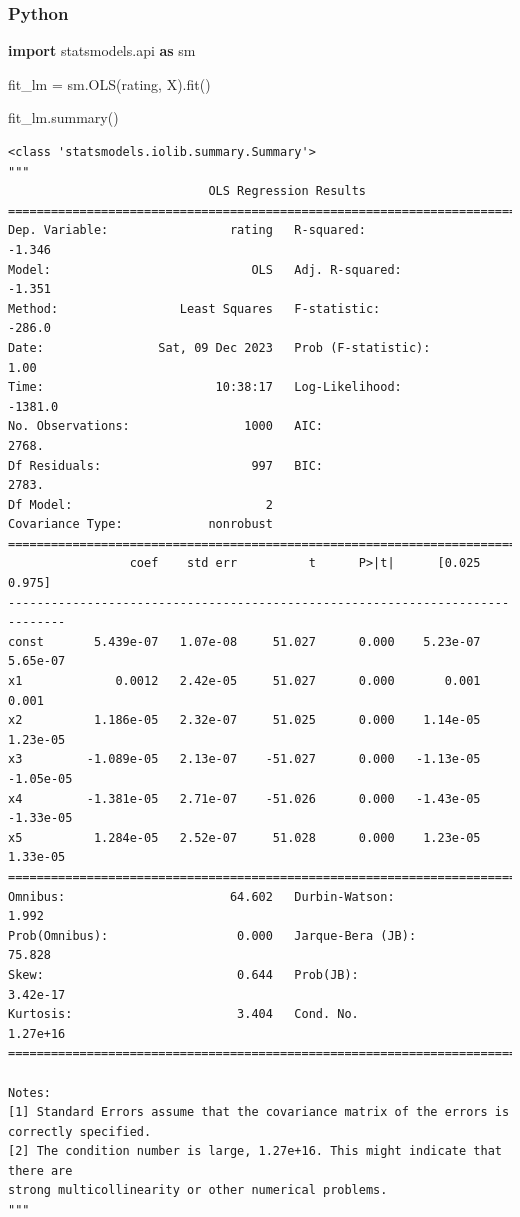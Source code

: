 \documentclass[
  letterpaper,
]{krantz}
\newenvironment{Shaded}{}{}
\newcommand{\ImportTok}[1]{\textcolor[rgb]{0.00,0.50,0.00}{\textbf{#1}}}
\newcommand{\NormalTok}[1]{#1}
\newcommand{\OperatorTok}[1]{\textcolor[rgb]{0.40,0.40,0.40}{#1}}
\begin{document}
\subsubsection{Python}

\begin{Shaded}
\begin{Highlighting}[]
\ImportTok{import}\NormalTok{ statsmodels.api }\ImportTok{as}\NormalTok{ sm}

\NormalTok{fit\_lm }\OperatorTok{=}\NormalTok{ sm.OLS(rating, X).fit()}

\NormalTok{fit\_lm.summary()}
\end{Highlighting}
\end{Shaded}

\begin{verbatim}
<class 'statsmodels.iolib.summary.Summary'>
"""
                            OLS Regression Results                            
==============================================================================
Dep. Variable:                 rating   R-squared:                      -1.346
Model:                            OLS   Adj. R-squared:                 -1.351
Method:                 Least Squares   F-statistic:                    -286.0
Date:                Sat, 09 Dec 2023   Prob (F-statistic):               1.00
Time:                        10:38:17   Log-Likelihood:                -1381.0
No. Observations:                1000   AIC:                             2768.
Df Residuals:                     997   BIC:                             2783.
Df Model:                           2                                         
Covariance Type:            nonrobust                                         
==============================================================================
                 coef    std err          t      P>|t|      [0.025      0.975]
------------------------------------------------------------------------------
const       5.439e-07   1.07e-08     51.027      0.000    5.23e-07    5.65e-07
x1             0.0012   2.42e-05     51.027      0.000       0.001       0.001
x2          1.186e-05   2.32e-07     51.025      0.000    1.14e-05    1.23e-05
x3         -1.089e-05   2.13e-07    -51.027      0.000   -1.13e-05   -1.05e-05
x4         -1.381e-05   2.71e-07    -51.026      0.000   -1.43e-05   -1.33e-05
x5          1.284e-05   2.52e-07     51.028      0.000    1.23e-05    1.33e-05
==============================================================================
Omnibus:                       64.602   Durbin-Watson:                   1.992
Prob(Omnibus):                  0.000   Jarque-Bera (JB):               75.828
Skew:                           0.644   Prob(JB):                     3.42e-17
Kurtosis:                       3.404   Cond. No.                     1.27e+16
==============================================================================

Notes:
[1] Standard Errors assume that the covariance matrix of the errors is correctly specified.
[2] The condition number is large, 1.27e+16. This might indicate that there are
strong multicollinearity or other numerical problems.
"""
\end{verbatim}
\end{document}
